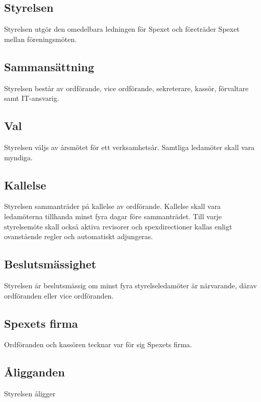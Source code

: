 \documentclass[a4paper]{article}
\begin{document}
\subsection{Styrelsen}
Styrelsen utgör den omedelbara ledningen för Spexet och företräder Spexet mellan föreningsmöten.

\subsection{Sammansättning}
Styrelsen består av ordförande, vice ordförande, sekreterare, kassör, förvaltare samt IT-ansvarig.

\subsection{Val}
Styrelsen väljs av årsmötet för ett verksamhetsår. Samtliga ledamöter skall vara myndiga.

\subsection{Kallelse}
Styrelsen sammanträder på kallelse av ordförande. Kallelse skall vara ledamöterna tillhanda minst fyra dagar före sammanträdet. Till varje styrelsemöte skall också aktiva revisorer och spexdirectioner kallas enligt ovanstående regler och automatiskt adjungeras.

\subsection{Beslutsmässighet}
Styrelsen är beslutsmässig om minst fyra styrelseledamöter är närvarande, därav ordföranden eller vice ordföranden.

\subsection{Spexets firma}
Ordföranden och kassören tecknar var för sig Spexets firma.

\subsection{Åligganden}
Styrelsen åligger
\end{document}
